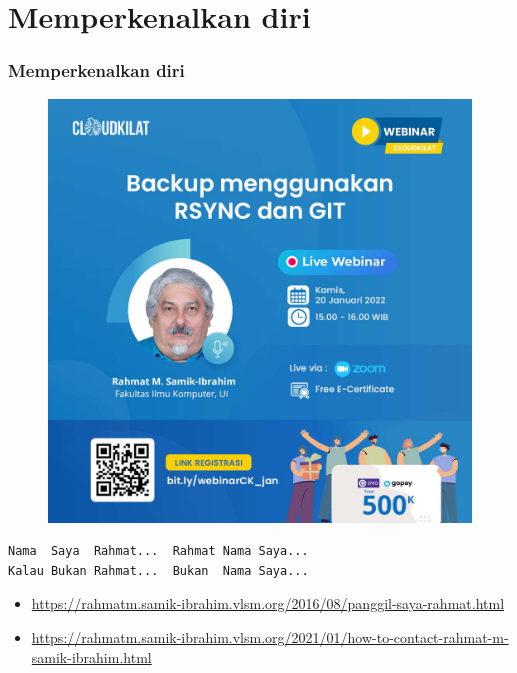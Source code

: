 \documentclass[xcolor=table, notheorems, hyperref={pdfpagelabels=false}]{beamer}
\begin{document}
\section{Memperkenalkan diri}
\begin{frame}[fragile]
\frametitle{Memperkenalkan diri}
\begin{figure}
\includegraphics[width=0.48\linewidth]{JPG-012}
\end{figure}
\begin{lstlisting}[basicstyle=\ttfamily\large]
Nama  Saya  Rahmat...  Rahmat Nama Saya...
Kalau Bukan Rahmat...  Bukan  Nama Saya...
\end{lstlisting}
{\tiny
\begin{itemize}
\item \url{https://rahmatm.samik-ibrahim.vlsm.org/2016/08/panggil-saya-rahmat.html}
\item \url{https://rahmatm.samik-ibrahim.vlsm.org/2021/01/how-to-contact-rahmat-m-samik-ibrahim.html}
\end{itemize}
}
\end{frame}

\end{document}
